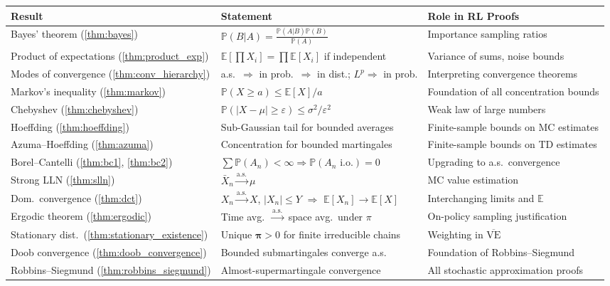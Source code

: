 \documentclass[11pt,a4paper]{article}
\theoremstyle{definition}
\theoremstyle{plain}
\theoremstyle{remark}
\newcommand{\E}{\mathbb{E}}
\newcommand{\Prob}{\mathbb{P}}
\newcommand{\cas}{\xrightarrow{\text{a.s.}}}
\begin{document}
\begin{center}
\renewcommand{\arraystretch}{1.5}
\begin{tabular}{p{3.8cm} p{5cm} p{5cm}}
\toprule
\textbf{Result} & \textbf{Statement} & \textbf{Role in RL Proofs} \\
\midrule
Bayes' theorem (\ref{thm:bayes}) & $\Prob(B|A) = \frac{\Prob(A|B)\Prob(B)}{\Prob(A)}$ & Importance sampling ratios \\
\addlinespace
Product of expectations (\ref{thm:product_exp}) & $\E[\prod X_i] = \prod \E[X_i]$ if independent & Variance of sums, noise bounds \\
\addlinespace
Modes of convergence (\ref{thm:conv_hierarchy}) & a.s.\ $\Rightarrow$ in prob.\ $\Rightarrow$ in dist.; $L^p \Rightarrow$ in prob. & Interpreting convergence theorems \\
\addlinespace
Markov's inequality (\ref{thm:markov}) & $\Prob(X \geq a) \leq \E[X]/a$ & Foundation of all concentration bounds \\
\addlinespace
Chebyshev (\ref{thm:chebyshev}) & $\Prob(|X - \mu| \geq \varepsilon) \leq \sigma^2/\varepsilon^2$ & Weak law of large numbers \\
\addlinespace
Hoeffding (\ref{thm:hoeffding}) & Sub-Gaussian tail for bounded averages & Finite-sample bounds on MC estimates \\
\addlinespace
Azuma--Hoeffding (\ref{thm:azuma}) & Concentration for bounded martingales & Finite-sample bounds on TD estimates \\
\addlinespace
Borel--Cantelli (\ref{thm:bc1}, \ref{thm:bc2}) & $\sum \Prob(A_n) < \infty \Rightarrow \Prob(A_n \text{ i.o.}) = 0$ & Upgrading to a.s.\ convergence \\
\addlinespace
Strong LLN (\ref{thm:slln}) & $\bar{X}_n \cas \mu$ & MC value estimation \\
\addlinespace
Dom.\ convergence (\ref{thm:dct}) & $X_n \cas X$, $|X_n| \leq Y$ $\Rightarrow$ $\E[X_n] \to \E[X]$ & Interchanging limits and $\E$ \\
\addlinespace
Ergodic theorem (\ref{thm:ergodic}) & Time avg.\ $\cas$ space avg.\ under $\pi$ & On-policy sampling justification \\
\addlinespace
Stationary dist.\ (\ref{thm:stationary_existence}) & Unique $\boldsymbol{\pi} > 0$ for finite irreducible chains & Weighting in $\overline{\text{VE}}$ \\
\addlinespace
Doob convergence (\ref{thm:doob_convergence}) & Bounded submartingales converge a.s. & Foundation of Robbins--Siegmund \\
\addlinespace
Robbins--Siegmund (\ref{thm:robbins_siegmund}) & Almost-supermartingale convergence & All stochastic approximation proofs \\
\bottomrule
\end{tabular}
\end{center}
\end{document}

